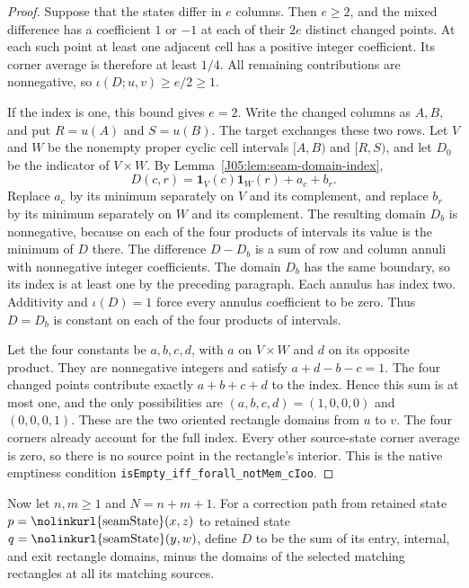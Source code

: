 \documentclass[11pt,oneside]{report}
\theoremstyle{definition}
\numberwithin{equation}{section}
\newcommand{\decl}[1]{\textnormal{\nolinkurl{#1}}}
\begin{document}
\begin{proof}
Suppose that the states differ in $e$ columns. Then $e\ge2$, and the
mixed difference has a coefficient $1$ or $-1$ at each of their $2e$
distinct changed points. At each such point at least one adjacent cell
has a positive integer coefficient. Its corner average is therefore
at least $1/4$. All remaining contributions are nonnegative, so
$\iota(D;u,v)\ge e/2\ge1$.

If the index is one, this bound gives $e=2$. Write the changed columns
as $A,B$, and put $R=u(A)$ and $S=u(B)$. The target exchanges these
two rows. Let $V$ and $W$ be the nonempty proper cyclic cell intervals
$[A,B)$ and $[R,S)$, and let $D_0$ be the indicator of $V\times W$.
By Lemma~\ref{J05:lem:seam-domain-index},
\[
 D(c,r)=\mathbf1_V(c)\mathbf1_W(r)+a_c+b_r.
\]
Replace $a_c$ by its minimum separately on $V$ and its complement,
and replace $b_r$ by its minimum separately on $W$ and its complement.
The resulting domain $D_b$ is nonnegative, because on each of the four
products of intervals its value is the minimum of $D$ there.
The difference $D-D_b$ is a sum of row and column annuli with
nonnegative integer coefficients. The domain $D_b$ has the same
boundary, so its index is at least one by the preceding paragraph.
Each annulus has index two. Additivity and $\iota(D)=1$ force every
annulus coefficient to be zero. Thus $D=D_b$ is constant on each of
the four products of intervals.

Let the four constants be $a,b,c,d$, with $a$ on $V\times W$ and
$d$ on its opposite product. They are nonnegative integers and satisfy
$a+d-b-c=1$. The four changed points contribute exactly
$a+b+c+d$ to the index. Hence this sum is at most one, and the
only possibilities are $(a,b,c,d)=(1,0,0,0)$ and $(0,0,0,1)$.
These are the two oriented rectangle domains from $u$ to $v$.
The four corners already account for the full index. Every other
source-state corner average is zero, so there is no source point in
the rectangle's interior. This is the native emptiness condition
\decl{isEmpty_iff_forall_notMem_cIoo}.
\end{proof}

Now let $n,m\ge1$ and $N=n+m+1$. For a correction path from retained
state $p=\decl{seamState}(x,z)$ to retained state
$q=\decl{seamState}(y,w)$, define $D$ to be the sum of its entry,
internal, and exit rectangle domains, minus the domains of the selected
matching rectangles at all its matching sources.
\end{document}
